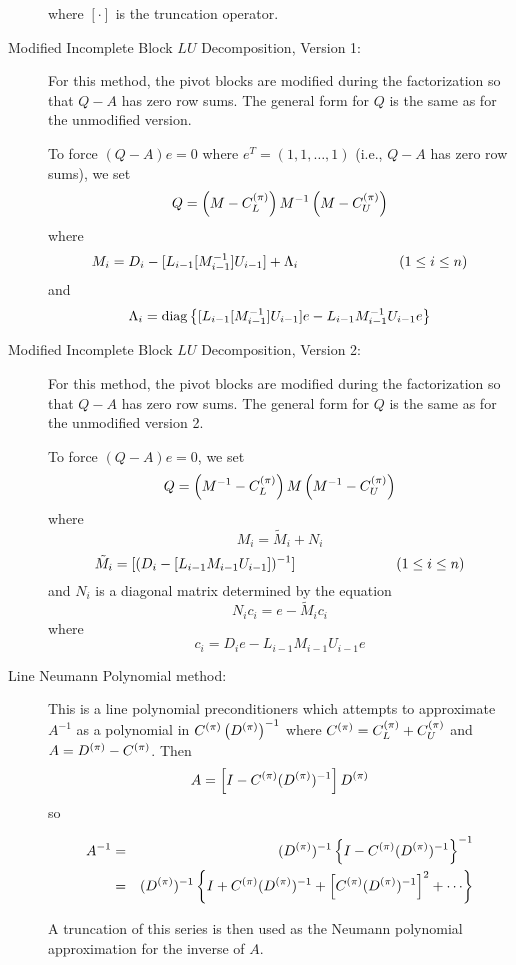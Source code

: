 \begin{description}
       where $[\cdot]$ is the truncation operator.
 
\item[Modified Incomplete Block $LU$ Decomposition, Version 1:]
      For this method, the pivot blocks are modified during the
      factorization so that $Q-A$ has zero row sums.  The general
      form for $Q$ is the same as for the unmodified version.
 
      To force $(Q-A)e=0$ where $e^T=(1,1,\ldots,1)$ (i.e., $Q-A$ has
      zero row sums), we set
      \[ Q=\left( M-C_L^{(\pi)} \right) M^{-1}\left( M-C_U^{(\pi)} \right) \]
      where
      \[ M_i=D_i-[L_{i-1}[M_{i-1}^{-1}]U_{i-1}]+\Lambda_i 
           \hspace*{1.0in} (1 \leq i \leq n) \]
      and 
      \[ \Lambda_i = \mbox{diag} \left\{ [L_{i-1}[M_{i-1}^{-1}]U_{i-1}]e
                  -  L_{i-1}M_{i-1}^{-1}U_{i-1}e \right\} \]
 
\item[Modified Incomplete Block $LU$ Decomposition, Version 2:]
      For this method, the pivot blocks are modified during the
      factorization so that $Q-A$ has zero row sums.  The general
      form for $Q$ is the same as for the unmodified version 2.
 
      To force $(Q-A)e = 0$, we set
      \[ Q=\left( M^{-1}-C_L^{(\pi)} \right) M \left( M^{-1}-C_U^{(\pi)} \right) \]
      where
      \[ M_i = \tilde{M}_i + N_i \]
      \[ \tilde{M}_i = [( D_i-[L_{i-1} M_{i-1} U_{i-1}] )^{-1} ] 
           \hspace*{1.0in} (1 \leq i \leq n) \]
       and $N_{i}$ is a diagonal matrix determined by the equation
      \[ N_i c_i  = e - \tilde{M}_i c_i \]
      where
      \[ c_i = D_i e - L_{i-1} M_{i-1} U_{i-1} e \]
 
\item[Line Neumann Polynomial method:]
      This is a line polynomial preconditioners which attempts to
      approximate $A^{-1}$ as a polynomial in $C^{(\pi)}\left(D^{(\pi)}\right)^{-1}$ 
      where $C^{(\pi)}=C_L^{(\pi)}+C_U^{(\pi)}$ and $A=D^{(\pi)}-C^{(\pi)}$.  Then
      \[ A = \left[ I - C^{(\pi)} (D^{(\pi)})^{-1}\right] D^{(\pi)} \]
      so
 
      \begin{eqnarray*}
        A^{-1} & = & (\pD)^{-1} 
                    \lc I - \pC(\pD)^{-1}\rc^{-1}    \\
          & = & (\pD)^{-1} \lc I + \pC(\pD)^{-1} + 
              \lb \pC(\pD)^{-1}\rb^2  + \cdots \rc
      \end{eqnarray*}
 
      A truncation of this series is then used as the Neumann
      polynomial approximation for the inverse of $A$.
 

\end{description}
